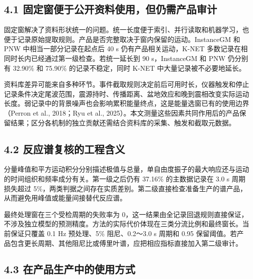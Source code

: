 \documentclass[UTF8,a4paper,zihao=5]{ctexart}
\begin{document}
\subsection*{4.1 固定窗便于公开资料使用，但仍需产品审计}\label{ux56faux5b9aux7a97ux4fbfux4e8eux516cux5f00ux8d44ux6599ux4f7fux7528ux4f46ux4ecdux9700ux4ea7ux54c1ux5ba1ux8ba1}

固定窗解决了资料形状统一的问题。统一长度便于索引、并行读取和机器学习，也便于记录原始提取规则。产品是否完整取决于窗内保留的运动。InstanceGM 和 PNW 中相当一部分记录在起点后 40 s 仍有产品相关运动，K-NET 多数记录在相同时长内已经通过第一级检查。若统一延长到 90 s，InstanceGM 和 PNW 仍分别有 32.90\% 和 75.90\% 的记录不稳定，同时 K-NET 中大量记录被不必要地延长。

资料库差异可能来自多种环节。事件截取规则决定前后可用时长，仪器触发和停止记录条件决定尾波范围，震源持时、传播距离、盆地效应和晚到震相改变实际运动长度。弱记录中的背景噪声也会影响累积能量终点，这是能量选窗已有的使用边界（Perron et al., 2018；Ryu et al., 2025）。本文测量这些因素共同作用后的产品保留结果；区分各机制的独立贡献还需结合资料库的采集、触发和截取元数据。

\subsection*{4.2 反应谱复核的工程含义}\label{ux53cdux5e94ux8c31ux590dux6838ux7684ux5de5ux7a0bux542bux4e49}

分量峰值和平方运动积分分别描述极值与总量，单自由度振子的最大响应还与运动的时间组织和频率成分有关。第一级之后仍有 37.16\% 的主数据记录在 3.0 s 周期损失超过 5\%，两类判据之间存在实质差别。第二级直接检查准备生产的谱产品，从而避免用峰值或能量间接替代反应谱。

最终处理窗在三个受检周期的失败率为 0，这一结果由全记录回退规则直接保证，不涉及独立模型的预测精度。方法的实际代价体现在三类分流比例和最终窗长。当前保证只覆盖 0.1 Hz 预处理、5\% 阻尼、0.2～3.0 s 周期和 0.95 保留阈值。若产品包含更长周期、其他阻尼比或傅里叶谱，应把相应指标直接加入第二级审计。

\subsection*{4.3 在产品生产中的使用方式}\label{ux5728ux4ea7ux54c1ux751fux4ea7ux4e2dux7684ux4f7fux7528ux65b9ux5f0f}
\end{document}
